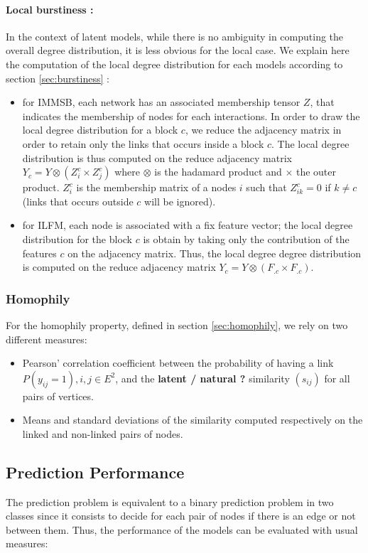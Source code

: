 \documentclass[a4paper, 12pt]{article}
\begin{document}
\paragraph{Local burstiness : }
In the context of latent models, while there is no ambiguity in computing the overall degree distribution, it is less obvious for the local case. We explain here the computation of the local degree distribution for each models according to section \ref{sec:burstiness} :
\begin{itemize}
        \item for IMMSB, each network has an associated membership tensor $Z$, that indicates the membership of nodes for each  interactions. In order to draw the local degree distribution for a block $c$, we reduce the adjacency matrix in order to retain only the links that occurs inside a block $c$. The local degree distribution is thus computed on the reduce adjacency matrix $Y_c = Y \otimes (Z_i^c \times Z_j^c)$ where $\otimes$ is the hadamard product and $\times$ the outer product. $Z_i^c$ is the membership matrix of a nodes $i$ such that $Z_{ik}^c=0$ if $k\neq c$ (links that occurs outside $c$ will be ignored).
        \item for ILFM, each node is associated with a fix feature vector; the local degree distribution for the block $c$ is obtain by taking only the contribution of the features $c$ on the adjacency matrix. Thus, the local degree degree distribution is computed on the reduce adjacency matrix $Y_c = Y \otimes (F_{.c}\times F_{.c})$. 
\end{itemize}

\subsubsection{Homophily}

For the homophily property, defined in section \ref{sec:homophily}, we rely on two different measures:

\begin{itemize}
    \item  Pearson' correlation coefficient between the probability of having a link $P(y_{ij}=1),  i, j \in E^2 $, and the  \textbf{latent / natural ?} similarity $(s_{ij})$ for all pairs of vertices. 
    \item  Means and standard deviations of the similarity computed respectively on the linked and non-linked pairs of nodes.
\end{itemize}

\subsection{Prediction Performance}
The prediction problem is equivalent to a binary prediction problem in two classes since it consists to decide for each pair of nodes if there is an edge or not between them. 
Thus, the performance of the models can be evaluated with usual measures:
\end{document}
